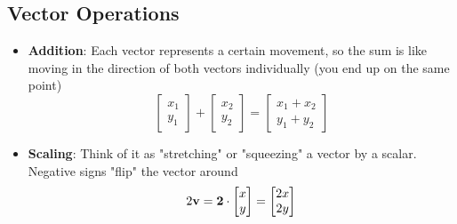 \subsection{Vector Operations}
\begin{itemize}
    \item \textbf{Addition}: Each vector represents a certain movement, so the sum is like moving in the direction of both vectors individually (you end up on the same point)
    $$
        \begin{bmatrix}
            x_1 \\
            y_1
        \end{bmatrix} +
        \begin{bmatrix}
            x_2 \\
            y_2
        \end{bmatrix} =
        \begin{bmatrix}
            x_1 + x_2 \\
            y_1 + y_2
        \end{bmatrix}
    $$
    \item \textbf{Scaling}: Think of it as "stretching" or "squeezing" a vector by a scalar. Negative signs "flip" the vector around
    $$
    2 \bf{v} = 2 \cdot  
    \begin{bmatrix}
         x \\ 
         y 
    \end{bmatrix} =
    \begin{bmatrix} 
            2x \\ 
            2y
    \end{bmatrix}
    $$ 
\end{itemize}